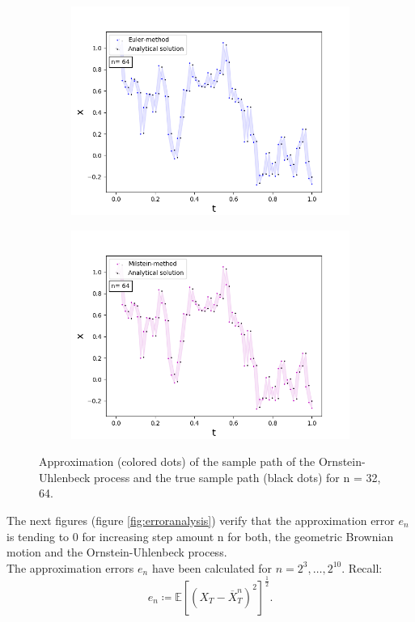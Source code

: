 \begin{figure}[!h]
\begin{subfigure}{0.49\linewidth}
   \end{subfigure}
   \begin{subfigure}{0.49\linewidth} \centering
     \includegraphics[scale=0.4]{Content/Graphics/SDE_EulerOU_n_64}
   \end{subfigure}
   \begin{subfigure}{0.49\linewidth} \centering
     \includegraphics[scale=0.4]{Content/Graphics/SDE_MilsteinOU_n_64}
   \end{subfigure}
\caption{Approximation (colored dots) of the sample path of the Ornstein-Uhlenbeck process and the true sample path (black dots) for n = 32, 64.} 
\end{figure}


The next figures (figure \ref{fig:erroranalysis}) verify that the approximation error \(e_n\) is tending to 0 for increasing step amount n for both, the geometric Brownian motion and the Ornstein-Uhlenbeck process.\\
The approximation errors \(e_n\) have been calculated for \(n = 2^3,\ldots, 2^{10}\). Recall:
\[e_n\coloneqq\mathbb{E}[(X_T - \overline{X}^{n}_{T})^2]^{\frac{1}{2}}.\]

